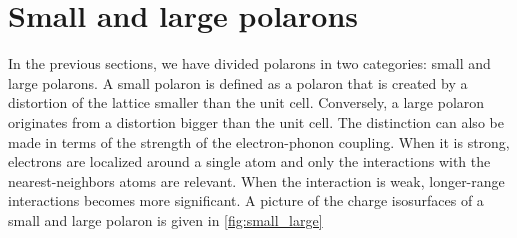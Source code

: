 \section{Small and large polarons}
In the previous sections, we have divided polarons in two categories: small and large polarons. A small polaron is defined as a polaron that is created by a distortion of the lattice smaller than the unit cell. Conversely, a large polaron originates from a distortion bigger than the unit cell. The distinction can also be made in terms of the strength of the electron-phonon coupling. When it is strong, electrons are localized around a single atom and only the interactions with the nearest-neighbors atoms are relevant. When the interaction is weak, longer-range interactions becomes more significant. A picture of the charge isosurfaces of a small and large polaron is given in \cref{fig:small_large}

